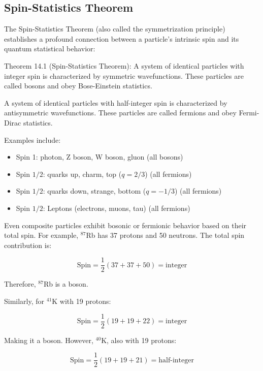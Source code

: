 \documentclass[italian]{HKNdocument}
\begin{document}
\subsection{Spin-Statistics Theorem}
The Spin-Statistics Theorem (also called the symmetrization principle) establishes a profound connection between a particle's intrinsic spin and its quantum statistical behavior:

Theorem 14.1 (Spin-Statistics Theorem): A system of identical particles with integer spin is characterized by symmetric wavefunctions. These particles are called bosons and obey Bose-Einstein statistics.

A system of identical particles with half-integer spin is characterized by antisymmetric wavefunctions. These particles are called fermions and obey Fermi-Dirac statistics.

Examples include:
\begin{itemize}
  \item Spin 1: photon, Z boson, W boson, gluon (all bosons)
  \item Spin $1/2$: quarks up, charm, top ($q=2/3$) (all fermions)
  \item Spin $1/2$: quarks down, strange, bottom ($q=-1/3$) (all fermions)
  \item Spin $1/2$: Leptons (electrons, muons, tau) (all fermions)
\end{itemize}

Even composite particles exhibit bosonic or fermionic behavior based on their total spin. For example, $^{87}$Rb has 37 protons and 50 neutrons. The total spin contribution is:

\begin{equation}
\text{Spin}=\frac{1}{2}(37+37+50)=\text{integer} \label{eq:14.28}
\end{equation}

Therefore, $^{87}$Rb is a boson.

Similarly, for $^{41}$K with 19 protons:

\begin{equation}
\text{Spin}=\frac{1}{2}(19+19+22)=\text{integer} \label{eq:14.29}
\end{equation}

Making it a boson. However, $^{40}$K, also with 19 protons:

\begin{equation}
\text{Spin}=\frac{1}{2}(19+19+21)=\text{half-integer} \label{eq:14.30}
\end{equation}
\end{document}
